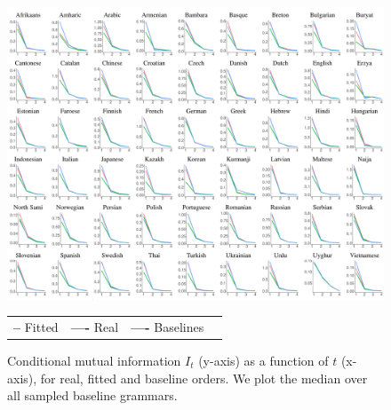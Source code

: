 \begin{figure}
	\begin{center}
\includegraphics[width=\textwidth]{it-table-mle.pdf}
\end{center}

\begin{center}
\begin{tabular}{llll}
\textbf{\textcolor{fitted}{--}} Fitted&
\textbf{\textcolor{real}{----}} Real&
\textbf{\textcolor{baseline}{----}} Baselines&
\end{tabular}
\end{center}
\caption{Conditional mutual information $I_t$ (y-axis) as a function of $t$ (x-axis), for real, fitted and baseline orders. We plot the median over all sampled baseline grammars.}\label{fig:it}
\end{figure}



